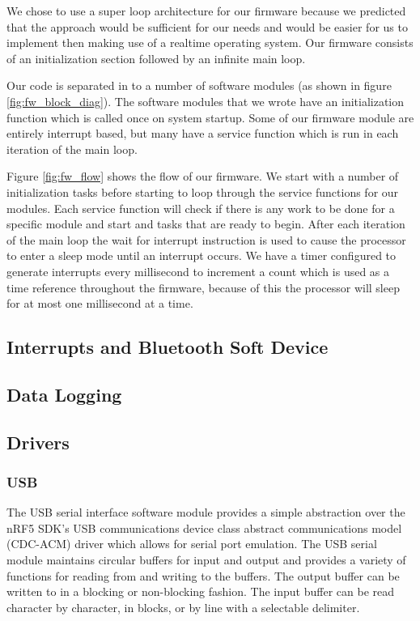 We chose to use a super loop architecture for our firmware because we predicted
that the approach would be sufficient for our needs and would be easier for us
to implement then making use of a realtime operating system. Our firmware
consists of an initialization section followed by an infinite main loop.

Our code is separated in to a number of software modules (as shown in figure
\ref{fig:fw_block_diag}). The software modules that we wrote have an
initialization function which is called once on system startup. Some of our
firmware module are entirely interrupt based, but many have a service function
which is run in each iteration of the main loop.

Figure \ref{fig:fw_flow} shows the flow of our firmware. We start with a number
of initialization tasks before starting to loop through the service functions
for our modules. Each service function will check if there is any work to be
done for a specific module and start and tasks that are ready to begin. After
each iteration of the main loop the wait for interrupt instruction is used to
cause the processor to enter a sleep mode until an interrupt occurs. We have a
timer configured to generate interrupts every millisecond to increment a count
which is used as a time reference throughout the firmware, because of this the
processor will sleep for at most one millisecond at a time.



\subsection{Interrupts and Bluetooth Soft Device}

\subsection{Data Logging}

\subsection{Drivers}

\subsubsection{USB}

The USB serial interface software module provides a simple abstraction over the
nRF5 SDK's USB communications device class abstract communications model
(CDC-ACM) driver which allows for serial port emulation. The USB serial module
maintains circular buffers for input and output and provides a variety of
functions for reading from and writing to the buffers. The output buffer can be
written to in a blocking or non-blocking fashion. The input buffer can be read
character by character, in blocks, or by line with a selectable delimiter.

